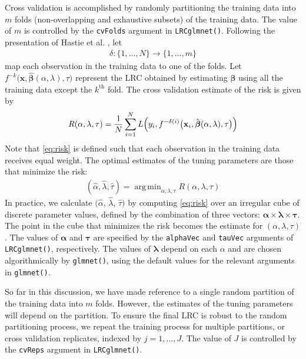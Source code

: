 \documentclass{article}
\DeclareMathOperator*{\argmin}{arg\,min}
\begin{document}
Cross validation is accomplished by randomly partitioning the training data into $m$ folds (non-overlapping and
exhaustive subsets) of the training data. The value of $m$ is controlled by the {\tt cvFolds} argument in 
{\tt LRCglmnet()}. Following the presentation of Hastie et al. \cite{Hastie}, let
\begin{align}
\delta:\{1,\ldots,N\} \rightarrow \{1, \ldots, m\}
\end{align}
\noindent map each observation in the training data to one of the folds.
Let $f^{-k} \bigl( \mathbf{x},\hat{\boldsymbol{\beta}}(\alpha,\lambda),\tau \bigr)$ represent the LRC obtained by estimating 
$\boldsymbol{\beta}$ using all the training data except the $k^{\text{th}}$ fold. The 
cross validation estimate of the risk is given by
\begin{align}
\label{eq:risk}
R(\alpha,\lambda,\tau) = \frac{1}{N}\sum_{i=1}^N L \Bigl(y_i, f^{-\delta(i)} \bigl(\mathbf{x}_i,
\hat{\boldsymbol{\beta}}(\alpha,\lambda),\tau \bigr) \Bigr)
\end{align}
\noindent Note that \eqref{eq:risk} is defined such that each observation in the training data receives 
equal weight. The optimal estimates of the tuning parameters are those that minimize the risk:
\begin{align}
(\hat\alpha,\hat\lambda,\hat\tau) = \argmin_{\alpha,\lambda,\tau} R(\alpha,\lambda,\tau)
\end{align}
In practice, we calculate $(\hat\alpha$, $\hat\lambda$, $\hat\tau)$ by computing \eqref{eq:risk} over an irregular
cube of discrete parameter values, defined by the combination of three vectors:  
$\boldsymbol\alpha \times \boldsymbol\lambda \times \boldsymbol\tau$.
The point in the cube that minimizes the risk becomes the estimate for $(\alpha, \lambda, \tau)$.
The values of $\boldsymbol\alpha$ and $\boldsymbol\tau$ are specified by the {\tt alphaVec} and {\tt tauVec} arguments
of {\tt LRCglmnet()}, respectively.  The values of $\boldsymbol\lambda$ depend on each $\alpha$ and are chosen algorithmically
by {\tt glmnet()}, using the default values for the relevant arguments in {\tt glmnet()}.

So far in this discussion, we have made reference to a single random partition of the training data into $m$ folds.  However,
the estimates of the tuning parameters will depend on the partition. To ensure the final LRC is robust to the random 
partitioning process, we repeat the training process for multiple partitions, or cross validation replicates, 
indexed by $j = 1,\ldots,J$.  The value of $J$ is controlled by the {\tt cvReps} argument in {\tt LRCglmnet()}.
\end{document}

